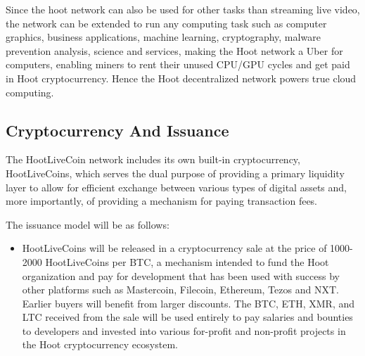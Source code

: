 \documentclass{article}
\begin{document}
Since the hoot network can also be used for other tasks than streaming live video, the network can be extended to run any computing task such as computer graphics, business applications, machine learning, cryptography, malware prevention analysis, science and services, making the Hoot network a Uber for computers, enabling miners to rent their unused CPU/GPU cycles and get paid in Hoot cryptocurrency. Hence the Hoot decentralized network powers true cloud computing.

\subsection{Cryptocurrency And Issuance}

The HootLiveCoin network includes its own built-in cryptocurrency, HootLiveCoins, which serves the dual purpose of providing a primary liquidity layer to allow for efficient exchange between various types of digital assets and, more importantly, of providing a mechanism for paying transaction fees.

The issuance model will be as follows:

\begin{itemize}

\item HootLiveCoins will be released in a cryptocurrency sale at the price of 1000-2000 HootLiveCoins per BTC, a mechanism intended to fund the Hoot organization and pay for development that has been used with success by other platforms such as Mastercoin, Filecoin, Ethereum, Tezos and NXT. Earlier buyers will benefit from larger discounts. The BTC, ETH, XMR, and LTC received from the sale will be used entirely to pay salaries and bounties to developers and invested into various for-profit and non-profit projects in the Hoot cryptocurrency ecosystem.

\end{itemize}
\end{document}
